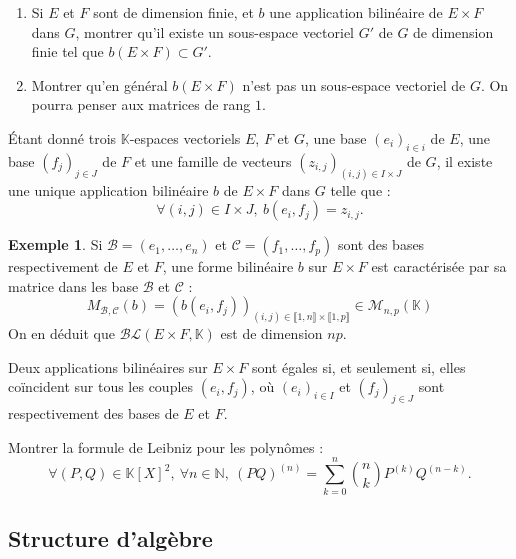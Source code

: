 \documentclass[french]{article}
\newcommand{\N}{\mathbb{N}}
\newcommand{\K}{\mathbb{K}}
\theoremstyle{plain}
\theoremstyle{definition}
\newtheorem*{ex}{Exemple}
\theoremstyle{remark}
\begin{document}
\begin{exo}
	\begin{enumerate}
		\item Si $E$ et $F$ sont de dimension finie, et $b$ une application bilinéaire de $E\times F$ dans $G$, montrer qu'il existe un sous-espace vectoriel $G'$ de $G$ de dimension finie tel que $b(E\times F)\subset G'$.
		\item Montrer qu'en général $b(E\times F)$ n'est pas un sous-espace vectoriel de $G$. On pourra penser aux matrices de rang $1$.
	\end{enumerate}
\end{exo}

\begin{prop}%
	Étant donné trois $\K$-espaces vectoriels $E$, $F$ et $G$, une base $(e_i)_{i\in i}$ de $E$, une base $(f_j)_{j\in J}$ de $F$ et une famille de vecteurs $(z_{i,j})_{(i,j)\in I\times J}$ de $G$, il existe une unique application bilinéaire $b$ de $E\times F$ dans $G$ telle que :
	$$\forall (i,j)\in I\times J,\ b(e_i,f_j)=z_{i,j}.$$
\end{prop}

\begin{ex}
	Si $\mathcal{B}=(e_1,\ldots,e_n)$ et $\mathcal{C}=(f_1,\ldots,f_p)$ sont des bases respectivement de $E$ et $F$, une forme bilinéaire $b$ sur $E\times F$ est caractérisée par sa matrice dans les base $\mathcal{B}$ et $\mathcal{C}$ : $$M_{\mathcal{B},\mathcal{C}}(b)=(b(e_i,f_j))_{(i,j)\in\llbracket1,n\rrbracket\times\llbracket1,p\rrbracket}\in\mathcal{M}_{n,p}(\K)$$ On en déduit que $\mathcal{BL}(E\times F,\K)$ est de dimension $np$.
\end{ex}

\begin{cor}%
	Deux applications bilinéaires sur $E\times F$ sont égales si, et seulement si, elles coïncident sur tous les couples $(e_i,f_j)$, où $(e_i)_{i\in I}$ et $(f_j)_{j\in J}$ sont respectivement des bases de $E$ et $F$.
\end{cor}

\begin{exo}
	Montrer la formule de Leibniz pour les polynômes : $$\forall (P,Q)\in\K[X]^2,\ \forall n\in\N,\ (PQ)^{(n)}=\sum_{k=0}^{n}\binom{n}{k}P^{(k)}Q^{(n-k)}.$$
\end{exo}

\subsection{Structure d'algèbre}
\end{document}
